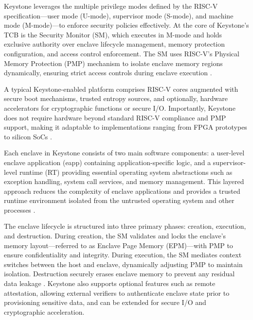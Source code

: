 Keystone leverages the multiple privilege modes defined by the RISC-V specification—user mode (U-mode), supervisor mode (S-mode), and machine mode (M-mode)—to enforce security policies effectively. At the core of Keystone’s TCB is the Security Monitor (SM), which executes in M-mode and holds exclusive authority over enclave lifecycle management, memory protection configuration, and access control enforcement. The SM uses RISC-V’s Physical Memory Protection (PMP) mechanism to isolate enclave memory regions dynamically, ensuring strict access controls during enclave execution \cite{dayeol2019keystone}.

A typical Keystone-enabled platform comprises RISC-V cores augmented with secure boot mechanisms, trusted entropy sources, and optionally, hardware accelerators for cryptographic functions or secure I/O. Importantly, Keystone does not require hardware beyond standard RISC-V compliance and PMP support, making it adaptable to implementations ranging from FPGA prototypes to silicon SoCs \cite{dayeol2019keystone}.

Each enclave in Keystone consists of two main software components: a user-level enclave application (eapp) containing application-specific logic, and a supervisor-level runtime (RT) providing essential operating system abstractions such as exception handling, system call services, and memory management. This layered approach reduces the complexity of enclave applications and provides a trusted runtime environment isolated from the untrusted operating system and other processes \cite{dayeol2019keystone}.

The enclave lifecycle is structured into three primary phases: creation, execution, and destruction. During creation, the SM validates and locks the enclave’s memory layout—referred to as Enclave Page Memory (EPM)—with PMP to ensure confidentiality and integrity. During execution, the SM mediates context switches between the host and enclave, dynamically adjusting PMP to maintain isolation. Destruction securely erases enclave memory to prevent any residual data leakage \cite{dayeol2019keystone}. Keystone also supports optional features such as remote attestation, allowing external verifiers to authenticate enclave state prior to provisioning sensitive data, and can be extended for secure I/O and cryptographic acceleration.

